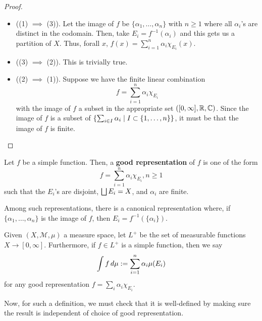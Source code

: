 \documentclass[11pt,leqno,oneside]{amsbook}
\numberwithin{thm}{section}
\newcommand{\M}{\mathcal{M}} %
\renewcommand{\de}{\textbf} %
\begin{document}
 \begin{proof}
   \begin{itemize}
   \item ((1) $\implies$ (3)). Let the image of $f$ be $\{\alpha_1,
     \ldots, \alpha_n\}$ with $n \geq 1$ where all $\alpha_i$'s are
     distinct in the codomain. Then, take $E_i = f^{-1}(\alpha_i)$ and
     this gets us a partition of $X$. Thus, forall $x$, $f(x) =
     \sum_{i=1}^n \alpha_i \chi_{E_i}(x)$.
   \item ((3) $\implies$ (2)). This is trivially true.
   \item ((2) $\implies$ (1)). Suppose we have the finite linear
     combination \[
       f = \sum_{i=1}^n \alpha_i \chi_{E_i}
     \]
     with the image of $f$ a subset in the appropriate set
     $([0,\infty],{\mathbb R},{\mathbb C})$. Since the image of $f$ is a subset of
     $\{\sum_{i \in I} \alpha_i \mid I \subset \{1,\ldots,n\}\}$, it
     must be that the image of $f$ is finite.
   \end{itemize}
 \end{proof}
 \begin{defn}
   Let $f$ be a simple function. Then, a \de{good representation} of
   $f$ is one of the form \[
     f = \sum_{i=1}^n \alpha_i \chi_{E_i}, n \geq 1
   \]
   such that the $E_i$'s are disjoint, $\bigsqcup E_i = X$, and
   $\alpha_i$ are finite.
 \end{defn}
Among such representations, there is a canonical representation where,
if $\{\alpha_1, \ldots, \alpha_n\}$ is the image of $f$, then $E_i =
f^{-1}(\{\alpha_i\})$.
\begin{defn}
  Given $(X, \M, \mu)$ a measure space, let $L^+$ be the set of
  measurable functions $X \to [0,\infty]$. Furthermore, if $f \in L^+$
  is a simple function, then we say \[
    \int f \, d\mu := \sum_{i=1}^n \alpha_i \mu(E_i)
  \]
  for any good representation $f = \sum_i \alpha_i \chi_{E_i}$.
\end{defn}
Now, for such a definition, we must check that it is well-defined by
making sure the result is independent of choice of good
representation.
\end{document}
